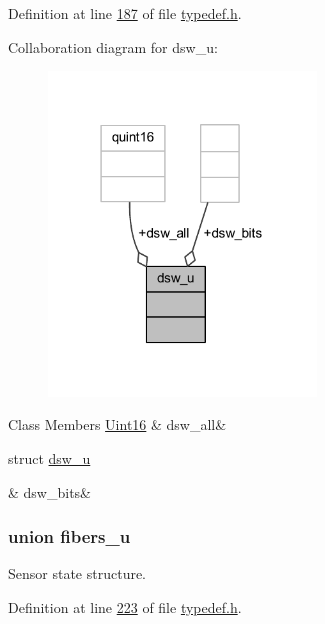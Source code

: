 Definition at line \hyperlink{a00001_source_l00187}{187} of file \hyperlink{a00001_source}{typedef.\+h}.



Collaboration diagram for dsw\+\_\+u\+:
\nopagebreak
\begin{figure}[H]
\begin{center}
\leavevmode
\includegraphics[width=202pt]{d7/d40/a00236}
\end{center}
\end{figure}
\begin{DoxyFields}{Class Members}
\hypertarget{a00001_aa6498d003ea18f45132c20b12d9d611e}{\hyperlink{a00001_aae7407b021d43f7193a81a58cfb3e297}{Uint16}}\label{a00001_aa6498d003ea18f45132c20b12d9d611e}
&
dsw\+\_\+all&
\\
\hline

\hypertarget{a00001_ae6770b435ec3fff3ad3f10c124420bb5}{struct \hyperlink{a00001_d9/db3/a00066}{dsw\+\_\+u}}\label{a00001_ae6770b435ec3fff3ad3f10c124420bb5}
&
dsw\+\_\+bits&
\\
\hline

\end{DoxyFields}
\label{d6/d2c/a00072}
\hypertarget{a00001_d6/d2c/a00072}{}
\subsubsection{union fibers\+\_\+u}
Sensor state structure. 

Definition at line \hyperlink{a00001_source_l00223}{223} of file \hyperlink{a00001_source}{typedef.\+h}.



